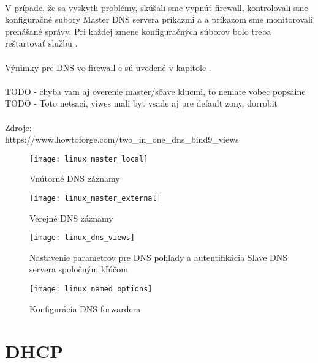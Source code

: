 \paragraph{}
V prípade, že sa vyskytli problémy, skúšali sme vypnúť firewall, kontrolovali sme konfiguračné súbory Master DNS servera príkazmi  a  a príkazom  sme monitorovali prenášané správy. Pri každej zmene konfiguračných súborov bolo treba reštartovať službu .

\paragraph{}
Výnimky pre DNS vo firewall-e sú uvedené v kapitole .

\paragraph{}
TODO - chyba vam aj overenie master/sôave klucmi, to nemate vobec popsaine
TODO - Toto netsaci, viwes mali byt vsade aj pre default zony, dorrobit
\\
\\
\noindent
Zdroje:\\
\noindent
https://www.howtoforge.com/two\_in\_one\_dns\_bind9\_views\\

\begin{figure}[!htb]
\centering
\texttt{[image: linux\_master\_local]}
\caption{Vnútorné DNS záznamy}
\label{fig:dns_internal}
\end{figure}

\begin{figure}[!htb]
\centering
\texttt{[image: linux\_master\_external]}
\caption{Verejné DNS záznamy}
\label{fig:dns_external}
\end{figure}

\begin{figure}[!htb]
\centering
\texttt{[image: linux\_dns\_views]}
\caption{Nastavenie parametrov pre DNS pohľady a autentifikácia Slave DNS servera spoločným kľúčom}
\label{fig:dns_views}
\end{figure}

\begin{figure}[!htb]
\centering
\texttt{[image: linux\_named\_options]}
\caption{Konfigurácia DNS forwardera}
\label{fig:dns_forwarder}
\end{figure}


\section{DHCP}
